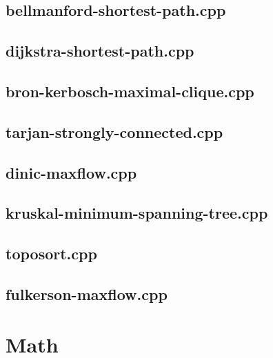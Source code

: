 \documentclass[10pt,twocolumn,landscape]{article}
\begin{document}
\subsection{bellmanford-shortest-path.cpp}


\subsection{dijkstra-shortest-path.cpp}


\subsection{bron-kerbosch-maximal-clique.cpp}


\subsection{tarjan-strongly-connected.cpp}


\subsection{dinic-maxflow.cpp}


\subsection{kruskal-minimum-spanning-tree.cpp}


\subsection{toposort.cpp}


\subsection{fulkerson-maxflow.cpp}


\section{Math}
\end{document}
